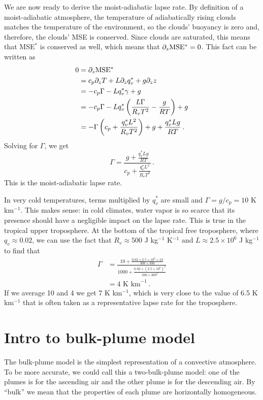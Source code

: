 \documentclass[12pt]{article}
\newcommand{\mse}{{\text{MSE}}}
\begin{document}
We are now ready to derive the moist-adiabatic lapse rate.  By definition of a moist-adiabatic atmosphere, the temperature of adiabatically rising clouds matches the temperature of the environment, so the clouds' buoyancy is zero and, therefore, the clouds' MSE is conserved.  Since clouds are saturated, this means that MSE$^*$ is conserved as well, which means that $\ppz \mse{}^* = 0$.  This fact can be written as
\begin{align*}
0 &= \ppz \mse{}^* \\
&= c_p \ppz T + L \ppz q_v^* + g \ppz z \\
&= -c_p \Gamma - L q_v^* \gamma + g \\
&= -c_p \Gamma - L q_v^* \left( \frac{L\Gamma}{R_v T^2} - \frac{g}{RT} \right) + g \\
&= -\Gamma \left( c_p + \frac{q_v^* L^2}{R_v T^2} \right) + g + \frac{q_v^* L g}{RT} \, .
\end{align*}
Solving for $\Gamma$, we get
\begin{equation}
\Gamma = \frac{\displaystyle g + \frac{q_v^*Lg}{RT}}{\displaystyle c_p + \frac{q_v^*L^2}{R_v T^2}} \, . \label{moist_adiabatic_lapse}
\end{equation}
This is the moist-adiabatic lapse rate.


In very cold temperatures, terms multiplied by $q_v^*$ are small and $\Gamma = g/c_p = 10$ K km$^{-1}$.  This makes sense: in cold climates, water vapor is so scarce that its presence should have a negligible impact on the lapse rate.  This is true in the tropical upper troposphere.  At the bottom of the tropical free troposphere, where $q_v \approx 0.02$, we can use the fact that $R_v \approx 500$ J kg$^{-1}$ K$^{-1}$ and $L \approx 2.5 \times 10^6$ J kg$^{-1}$ to find that
\begin{align}
\Gamma &= \frac{10 + \frac{0.02 \times 2.5 \times 10^6 \times 10}{300 \times 300}}{1000 + \frac{0.02 \times (2.5 \times 10^6)^2}{500 \times 300^2}} \\
&= 4 \text{ K km}^{-1} \, .
\end{align}
If we average 10 and 4 we get 7 K km$^{-1}$, which is very close to the value of 6.5 K km$^{-1}$ that is often taken as a representative lapse rate for the troposphere.


\section{Intro to bulk-plume model}


The bulk-plume model is the simplest representation of a convective atmosphere.  To be more accurate, we could call this a two-bulk-plume model: one of the plumes is for the ascending air and the other plume is for the descending air.  By ``bulk'' we mean that the properties of each plume are horizontally homogeneous.
\end{document}
